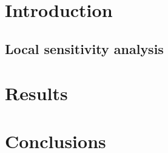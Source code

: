 \documentclass[a4paper,fleqn]{cas-dc}
\begin{document}
\maketitle


\section{Introduction}








\subsection{Local sensitivity analysis} \label{CH: Sensitivity_Analysis}



\section{Results}


\section{Conclusions} \label{CH: Conclusion}
\end{document}
